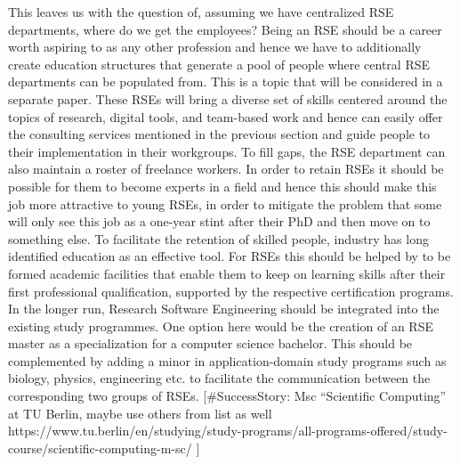 \documentclass{article}
\begin{document}
This leaves us with the question of, assuming we have centralized RSE departments, where do we get the employees?
Being an RSE should be a career worth aspiring to as any other profession and hence we have to additionally create education structures that generate a pool of people where central RSE departments can be populated from.
This is a topic that will be considered in a separate paper.
These RSEs will bring a diverse set of skills centered around the topics of research, digital tools, and team-based work and hence can easily offer the consulting services mentioned in the previous section and guide people to their implementation in their workgroups.
To fill gaps, the RSE department can also maintain a roster of freelance workers.
In order to retain RSEs it should be possible for them to become experts in a field and hence this should make this job more attractive to young RSEs, in order to mitigate the problem that some will only see this job as a one-year stint after their PhD and then move on to something else. To facilitate the retention of skilled people, industry has long identified education as an effective tool. For RSEs this should be helped by to be formed academic facilities that enable them to keep on learning skills after their first professional qualification, supported by the respective certification programs. In the longer run, Research Software Engineering should be integrated into the existing study programmes. One option here would be the creation of an RSE master as a specialization for a computer science bachelor. This should be complemented by adding a minor in application-domain study programs such as biology, physics, engineering etc. to facilitate the communication between the corresponding two groups of RSEs.
[\#SuccessStory: Msc “Scientific Computing” at TU Berlin, maybe use others from list as well https://www.tu.berlin/en/studying/study-programs/all-programs-offered/study-course/scientific-computing-m-sc/ ]

\printbibliography[heading=bibintoc]
\end{document}
